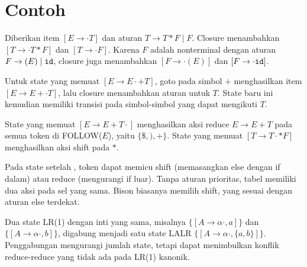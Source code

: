 \section*{Contoh}

\begin{contoh}
Diberikan item \([E \to \cdot T]\) dan aturan
\(T \to T * F \mid F\). Closure menambahkan
\([T \to \cdot T * F]\) dan \([T \to \cdot F]\). Karena \(F\)
adalah nonterminal dengan aturan \(F \to (E) \mid \texttt{id}\),
closure juga menambahkan \([F \to \cdot (E)]\) dan
\([F \to \cdot \texttt{id}]\).
\end{contoh}

\begin{contoh}
Untuk state yang memuat \([E \to E \cdot + T]\), goto pada simbol
\(+\) menghasilkan item \([E \to E + \cdot T]\), lalu closure
menambahkan aturan untuk \(T\). State baru ini kemudian memiliki
transisi pada simbol-simbol yang dapat mengikuti \(T\).
\end{contoh}

\begin{contoh}
State yang memuat \([E \to E + T \cdot]\) menghasilkan aksi reduce
\(E \to E + T\) pada semua token di FOLLOW(\(E\)), yaitu
\(\{\$, ), +\}\). State yang memuat \([T \to T \cdot * F]\)
menghasilkan aksi shift pada \(*\).
\end{contoh}

\begin{contoh}
Pada state setelah , token  dapat
memicu shift (memasangkan else dengan if dalam) atau reduce
(mengurangi if luar). Tanpa aturan prioritas, tabel memiliki dua
aksi pada sel yang sama. Bison biasanya memilih shift, yang sesuai
dengan aturan else terdekat.
\end{contoh}

\begin{contoh}
Dua state LR(1) dengan inti yang sama, misalnya
\(\{[A \to \alpha \cdot, a]\}\) dan
\(\{[A \to \alpha \cdot, b]\}\), digabung menjadi satu state LALR
\(\{[A \to \alpha \cdot, \{a,b\}]\}\). Penggabungan mengurangi
jumlah state, tetapi dapat menimbulkan konflik reduce-reduce yang
tidak ada pada LR(1) kanonik.
\end{contoh}
